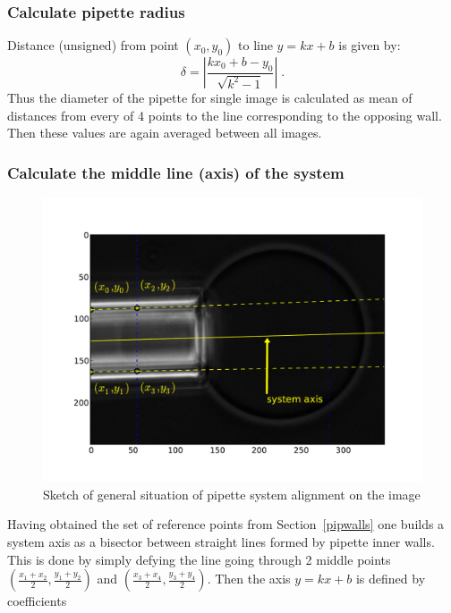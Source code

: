\subsubsection{Calculate pipette radius}\label{calcpiprad}

Distance (unsigned) from point $\left(x_0,y_0\right)$ to line $y=kx+b$ is given by:
\begin{equation}
	\delta = \left|\frac{kx_0+b-y_0}{\sqrt{k^2-1}}\right|\;.
	\label{eq:pointtoline}
\end{equation}
Thus the diameter of the pipette for single image is calculated as mean of distances from every of 4 points to the line corresponding to the opposing wall. Then these values are again averaged between all images.

\subsubsection{Calculate the middle line (axis) of the system}\label{calcaxis}

\begin{figure}
	\includegraphics[width=\columnwidth]{figs/pipetteaxis.pdf}
 	\caption{Sketch of general situation of pipette system alignment on the image}
 	\label{fig:pipetteaxis}
\end{figure}

Having obtained the set of reference points from Section~\ref{pipwalls} one builds a system axis as a bisector between straight lines formed by pipette inner walls. This is done by simply defying the line going through 2 middle points $\left(\frac{x_1+x_2}{2}, \frac{y_1+y_2}{2}\right)$ and $\left(\frac{x_3+x_4}{2}, \frac{y_3+y_4}{2}\right)$. Then the axis $y = kx+b$ is defined by coefficients

